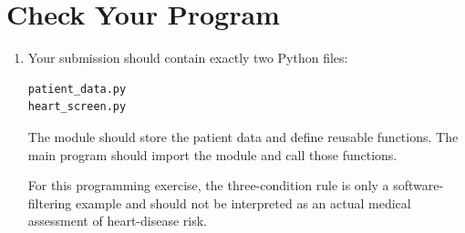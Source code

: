 \documentclass{article}
\begin{document}
\section{Check Your Program}

\begin{enumerate}

\item Your submission should contain exactly two Python files:

\begin{verbatim}
patient_data.py
heart_screen.py
\end{verbatim}

The module should store the patient data and define reusable
functions.  The main program should import the module and call
those functions.

For this programming exercise, the three-condition rule is only a
software-filtering example and should not be interpreted as an
actual medical assessment of heart-disease risk.

\end{enumerate}
\end{document}
